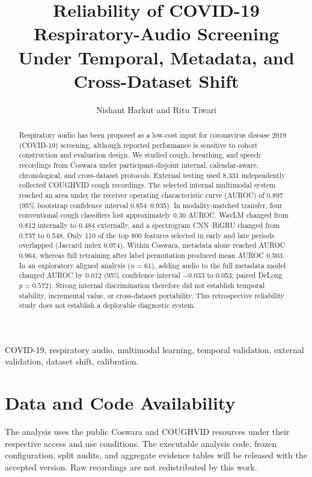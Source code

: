 \documentclass[12pt,draftclsnofoot,onecolumn]{IEEEtran}
\title{Reliability of COVID-19 Respiratory-Audio Screening Under Temporal, Metadata, and Cross-Dataset Shift}
\author{Nishant Harkut and Ritu Tiwari}
\begin{document}
\maketitle

\begin{abstract}
Respiratory audio has been proposed as a low-cost input for coronavirus disease
2019 (COVID-19) screening, although reported performance is sensitive to cohort
construction and evaluation design. We studied cough, breathing, and speech
recordings from Coswara under participant-disjoint internal, calendar-aware,
chronological, and cross-dataset protocols. External testing used 8,331
independently collected COUGHVID cough recordings. The selected internal
multimodal system reached an area under the receiver operating characteristic
curve (AUROC) of 0.897 (95\% bootstrap confidence interval 0.854--0.935). In
modality-matched transfer, four conventional cough classifiers lost
approximately 0.30 AUROC. WavLM changed from 0.812 internally to 0.484
externally, and a
spectrogram CNN--BiGRU changed from 0.737 to 0.548. Only 110 of the top 800
features selected in early and late periods overlapped (Jaccard index 0.074).
Within Coswara, metadata alone reached AUROC 0.964, whereas full retraining
after label permutation produced mean AUROC 0.503. In an exploratory aligned
analysis ($n=61$), adding audio to the full metadata model changed AUROC by
0.012 (95\% confidence interval $-0.033$ to 0.053; paired DeLong $p=0.572$).
Strong internal discrimination therefore did not establish temporal stability,
incremental value, or cross-dataset portability. This retrospective reliability
study does not establish a deployable diagnostic system.
\end{abstract}

\begin{IEEEkeywords}
COVID-19, respiratory audio, multimodal learning, temporal validation,
external validation, dataset shift, calibration.
\end{IEEEkeywords}







\appendices



\section*{Data and Code Availability}
The analysis uses the public Coswara and COUGHVID resources under their
respective access and use conditions. The executable analysis code, frozen
configuration, split audits, and aggregate evidence tables will be released
with the accepted version. Raw recordings are not redistributed by this work.
\end{document}
